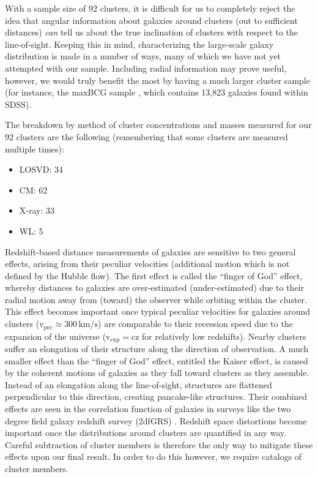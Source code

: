 With a sample size of 92 clusters, it is difficult for us to completely reject the
idea that angular information about galaxies around clusters (out to sufficient
distances) {\em can} tell us about the true inclination of clusters with
respect to the line-of-sight. Keeping this in mind, characterizing the
large-scale galaxy distribution is made in a number of ways, many of
which we have not yet attempted with our sample. Including radial information
may prove useful, however, we would truly benefit the most by having a much
larger cluster sample (for instance, the maxBCG sample \citealt{KO07.1}, which
contains 13,823 galaxies found within SDSS).

The breakdown by method of cluster concentrations and masses measured for our
92 clusters are the following (remembering that some clusters are measured
multiple times): 
\begin{itemize}
\item LOSVD: 34 
\item CM: 62
\item X-ray: 33
\item WL: 5
\end{itemize}

Redshift-based distance measurements of galaxies are
sensitive to two general effects, arising from their peculiar velocities
(additional motion which is not defined by the Hubble flow). The first effect is
called the ``finger of God'' effect, whereby distances to galaxies are over-estimated
(under-estimated) due to their radial motion away from (toward) the observer
while orbiting within the cluster. This effect becomes important once typical
peculiar velocities for galaxies around clusters ($\mathrm{v_{pec} \approx 300
  \, km/s}$) are comparable to their recession speed due to the expansion of the
universe ($\mathrm{v_{exp} = cz}$ for relatively low redshifts). Nearby
clusters suffer an elongation of their structure along the direction of
observation. A much smaller effect than the ``finger of God'' effect, entitled
the Kaiser effect, is caused by the coherent motions of galaxies as they fall
toward clusters as they assemble. Instead of an elongation along the
line-of-sight, structures are flattened perpendicular to this direction,
creating pancake-like structures. Their combined effects are 
seen in the correlation function of galaxies in surveys like the two degree
field galaxy redshift survey (2dfGRS) \citep{HA03.1}. Redshift space
distortions become important once the distributions around clusters are
quantified in any way. Careful subtraction of cluster members is therefore the
only way to mitigate these effects upon our final result. In order to do this
however, we require catalogs of cluster members.

